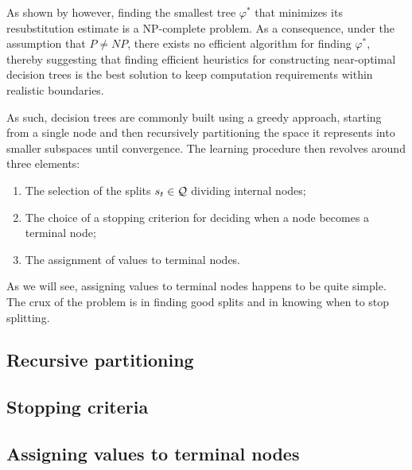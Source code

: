 As shown by \citet{hyafil:1976} however, finding the smallest tree $\varphi^*$
that minimizes its resubstitution estimate is a NP-complete problem. As a
consequence, under the assumption that $P \neq NP$, there exists no efficient
algorithm for finding $\varphi^*$, thereby suggesting that finding efficient heuristics
for constructing near-optimal decision trees is the best solution to keep computation
requirements within realistic boundaries.

As such, decision trees are commonly built using a greedy approach, starting
from a single node and then recursively partitioning the space it represents
into smaller subspaces until convergence.  The learning procedure then revolves
around three elements:

\begin{enumerate}
\item The selection of the splits $s_t \in {\cal Q}$ dividing internal nodes;
\item The choice of a stopping criterion for deciding when a node becomes a terminal node;
\item The assignment of values to terminal nodes.
\end{enumerate}

As we will see, assigning values to terminal nodes happens to be quite simple.
The crux of the problem is in finding good splits and in knowing when to
stop splitting.

\subsection{Recursive partitioning}


\subsection{Stopping criteria}


\subsection{Assigning values to terminal nodes}


